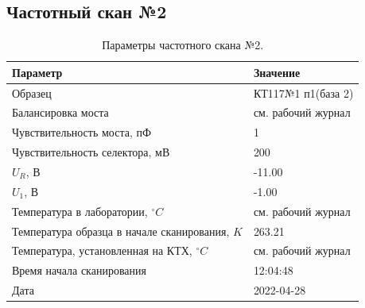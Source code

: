 \subsection{Частотный скан №2}
\begin{table}[!ht]
    \centering
    \caption{Параметры частотного скана №2.}
    \begin{tabular}{|l|l|}
        \hline
        Параметр                                       & Значение                  \\ \hline
        Образец                                        & КТ117№1 п1(база 2)        \\ \hline
        Балансировка моста                             & см. рабочий журнал        \\ \hline
        Чувствительность моста, пФ                     & 1                         \\ \hline
        Чувствительность селектора, мВ                 & 200                       \\ \hline
        $U_R$, В                                       & -11.00                    \\ \hline
        $U_1$, В                                       & -1.00                     \\ \hline
        Температура в лаборатории, $^\circ C$          & см. рабочий журнал        \\ \hline
        Температура образца в начале сканирования, $K$ & 263.21                    \\ \hline
        Температура, установленная на КТХ, $^\circ C$  & см. рабочий журнал        \\ \hline
        Время начала сканирования                      & 12:04:48                  \\ \hline
        Дата                                           & 2022-04-28                \\ \hline
    \end{tabular}
    \label{table:frequency_scan_2}
\end{table}

